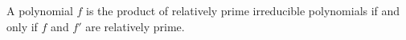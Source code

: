 A polynomial $f$ is the product of relatively prime irreducible polynomials if and only if $f$ and $f'$ are relatively prime.
